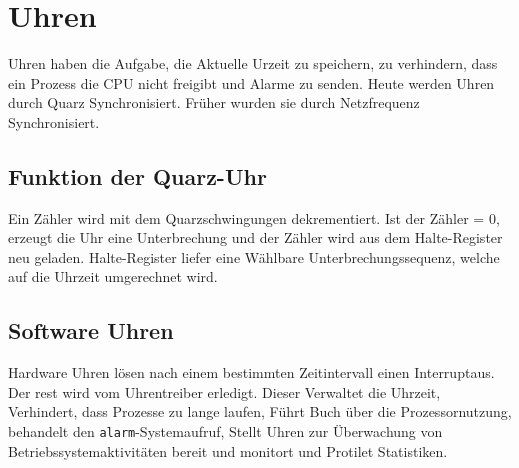 \section{Uhren}

Uhren haben die Aufgabe, die Aktuelle Urzeit zu speichern, zu verhindern, dass
ein Prozess die CPU nicht freigibt und Alarme zu senden. Heute werden Uhren
durch Quarz Synchronisiert. Früher wurden sie durch Netzfrequenz
Synchronisiert.

\subsection{Funktion der Quarz-Uhr}

Ein Zähler wird mit dem Quarzschwingungen dekrementiert. Ist der Zähler = 0,
erzeugt die Uhr eine Unterbrechung und der Zähler wird aus dem Halte-Register
neu geladen. Halte-Register liefer eine Wählbare Unterbrechungssequenz, welche
auf die Uhrzeit umgerechnet wird.

\subsection{Software Uhren}

Hardware Uhren lösen nach einem bestimmten Zeitintervall einen Interruptaus.
Der rest wird vom Uhrentreiber erledigt. Dieser Verwaltet die Uhrzeit,
Verhindert, dass Prozesse zu lange laufen, Führt Buch über die
Prozessornutzung, behandelt den \texttt{alarm}-Systemaufruf, Stellt Uhren zur
Überwachung von Betriebssystemaktivitäten bereit und monitort und Protilet
Statistiken.